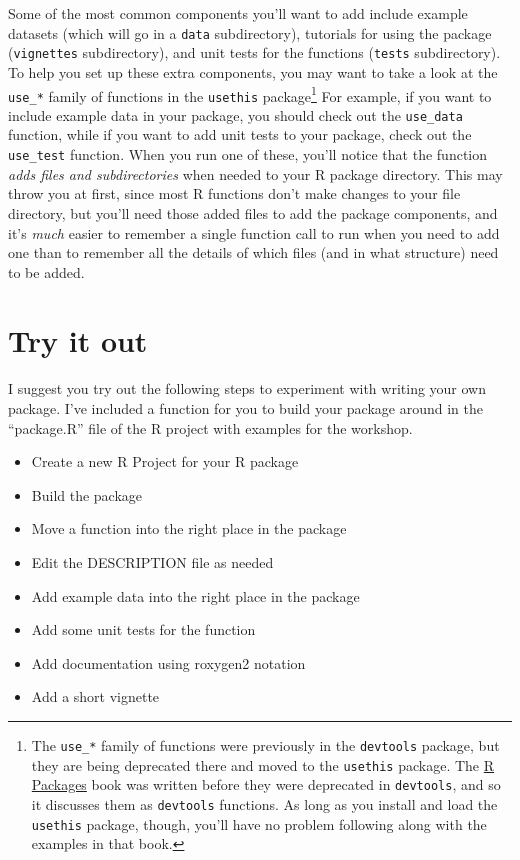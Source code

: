 \documentclass[]{tufte-book}
\providecommand{\tightlist}{%
  \setlength{\itemsep}{0pt}\setlength{\parskip}{0pt}}
\begin{document}
Some of the most common components you'll want to add include example datasets
(which will go in a \texttt{data} subdirectory), tutorials for using the package
(\texttt{vignettes} subdirectory), and unit tests for the functions (\texttt{tests}
subdirectory). To help you set up these extra components, you may want to take a
look at the \texttt{use\_*} family of functions in the \texttt{usethis} \citep{R-usethis}
package\footnote{The \texttt{use\_*} family of functions were previously in the \texttt{devtools}
  package, but they are being deprecated there and moved to the \texttt{usethis} package.
  The \href{http://r-pkgs.had.co.nz/}{R Packages} book was written before they were
  deprecated in \texttt{devtools}, and so it discusses them as \texttt{devtools} functions. As
  long as you install and load the \texttt{usethis} package, though, you'll have no
  problem following along with the examples in that book.} For example, if you
want to include example data in your package, you should check out the
\texttt{use\_data} function, while if you want to add unit tests to your package, check
out the \texttt{use\_test} function. When you run one of these, you'll notice that the
function \emph{adds files and subdirectories} when needed to your R package
directory. This may throw you at first, since most R functions don't make
changes to your file directory, but you'll need those added files to add the
package components, and it's \emph{much} easier to remember a single function call to
run when you need to add one than to remember all the details of which files (and
in what structure) need to be added.

\hypertarget{try-it-out}{%
\section{Try it out}\label{try-it-out}}

I suggest you try out the following steps to experiment with
writing your own package. I've included a function for you to build
your package around in the ``package.R'' file of the R project with
examples for the workshop.

\begin{itemize}
\tightlist
\item
  Create a new R Project for your R package
\item
  Build the package
\item
  Move a function into the right place in the package
\item
  Edit the DESCRIPTION file as needed
\item
  Add example data into the right place in the package
\item
  Add some unit tests for the function
\item
  Add documentation using roxygen2 notation
\item
  Add a short vignette
\end{itemize}
\end{document}
